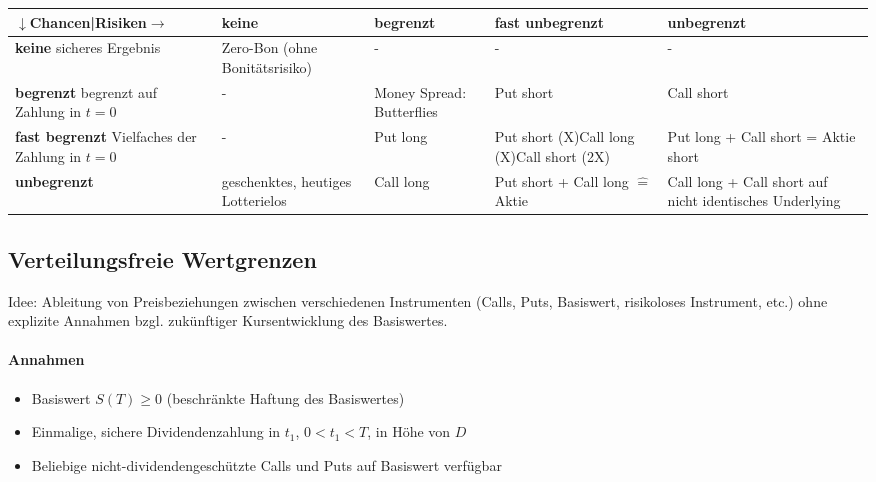 \begin{tabularx}{\columnwidth}{|X|X|X|X|X|}
	\hline
	\textbf{\(\downarrow\)Chancen|Risiken\(\rightarrow\)} & \textbf{keine} & \textbf{begrenzt} & \textbf{fast unbegrenzt} & \textbf{unbegrenzt} \\
	\hline
	\textbf{keine} \newline sicheres Ergebnis & Zero-Bon (ohne Bonitätsrisiko) & - & - & - \\
	\hline
	\textbf{begrenzt} \newline begrenzt auf Zahlung in \(t=0\) & - & Money Spread: Butterflies & Put short & Call short \\
	\hline
	\textbf{fast begrenzt} \newline Vielfaches der Zahlung in \(t=0\) & - & Put long & Put short (X)\newline Call long (X)\newline Call short (2X) & Put long + Call short = Aktie short \\
	\hline
	\textbf{unbegrenzt} & geschenktes, heutiges Lotterielos & Call long & Put short + Call long \(\hat{=}\) Aktie & Call long + Call short auf nicht identisches Underlying \\
	\hline
\end{tabularx}


\subsection{Verteilungsfreie Wertgrenzen}
Idee: Ableitung von Preisbeziehungen zwischen verschiedenen Instrumenten (Calls, Puts, Basiswert, risikoloses Instrument, etc.) ohne explizite Annahmen bzgl. zukünftiger Kursentwicklung des Basiswertes.

\paragraph{Annahmen}
\begin{itemize}
	\item Basiswert \(S(T) \ge 0\) (beschränkte Haftung des Basiswertes)
	\item Einmalige, sichere Dividendenzahlung in \(t_1\), \(0 < t_1 < T\), in Höhe von \(D\)
	\item Beliebige nicht-dividendengeschützte Calls und Puts auf Basiswert verfügbar
\end{itemize}

